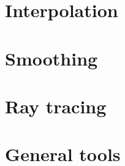 \documentclass[10pt]{book}
\begin{document}

   

\chapter{Interpolation}\label{sec:interpolation}

\chapter{Smoothing}\label{sec:smoothing}


\chapter{Ray tracing}\label{sec:ray}

\chapter{General tools}\label{sec:general}
\end{document}
